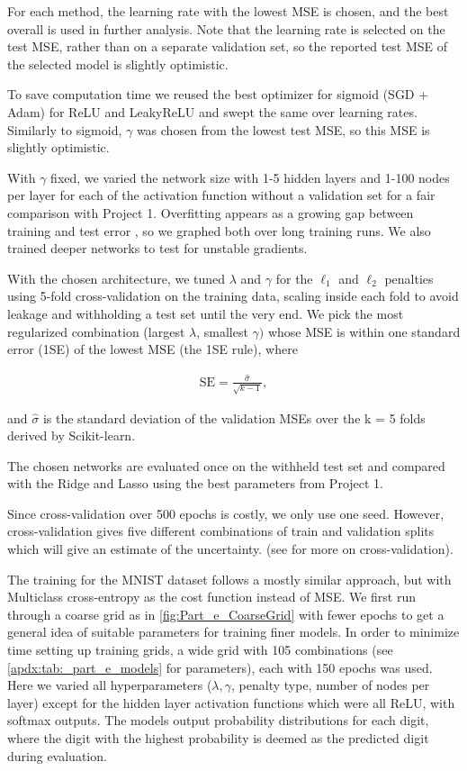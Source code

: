 \documentclass[reprint,english,notitlepage, floatfix]{revtex4-2}  %
\begin{document}
For each method, the learning rate with the lowest MSE is chosen, and the best overall is used in further analysis. Note that the learning rate is selected on the test MSE, rather than on a separate validation set, so the reported test MSE of the selected model is slightly optimistic. 


To save computation time we reused the best optimizer for sigmoid (SGD + Adam) for ReLU and LeakyReLU and swept the same over learning rates. Similarly to sigmoid, $\gamma$ was chosen from the lowest test MSE, so this MSE is slightly optimistic. 

With $\gamma$ fixed, we varied the network size with 1-5 hidden layers and 1-100 nodes per layer for each of the activation function without a validation set for a fair comparison with Project 1. Overfitting appears as a growing gap between training and test error \cite{project2_task}, so we graphed both over long training runs. We also trained deeper networks to test for unstable gradients.

With the chosen architecture, we tuned $\lambda$ and $\gamma$ for the $\ell_1$ and $\ell_2$ penalties using 5-fold cross-validation on the training data, scaling inside each fold to avoid leakage and withholding a test set until the very end. We pick the most regularized combination (largest $\lambda$, smallest $\gamma)$ whose MSE is within one standard error (1SE) of the lowest MSE (the 1SE rule), where

\begin{align*}
    \text{SE} = \frac{\hat{\sigma}}{\sqrt{k-1}},
\end{align*}

and $\hat{\sigma}$ is the standard deviation of the validation MSEs over the k = 5 folds derived by Scikit-learn. 

The chosen networks are evaluated once on the withheld test set and compared with the Ridge and Lasso using the best parameters from Project 1. 

Since cross-validation over 500 epochs is costly, we only use one seed. However, cross-validation gives five different combinations of train and validation splits which will give an estimate of the uncertainty. (see \cite{p1} for more on cross-validation). 

The training for the MNIST dataset follows a mostly similar approach, but with Multiclass cross-entropy as the cost function instead of MSE. We first run through a coarse grid as in \cref{fig:Part_e_CoarseGrid} with fewer epochs to get a general idea of suitable parameters for training finer models. In order to minimize time setting up training grids, a wide grid with 105 combinations (see \cref{apdx:tab:_part_e_models} for parameters), each with 150 epochs was used. Here we varied all hyperparameters ($\lambda, \gamma$, penalty type, number of nodes per layer) except for the hidden layer activation functions which were all ReLU, with softmax outputs. The models output probability distributions for each digit, where the digit with the highest probability is deemed as the predicted digit during evaluation. 
\end{document}
